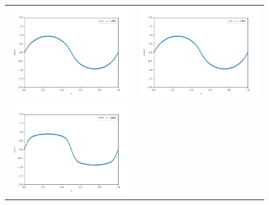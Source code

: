 \documentclass[12pt, reqno]{report}
\theoremstyle{definition}
\theoremstyle{remark}
\begin{document}
\begin{figure}[H]
\begin{tabular}{cc}
        \includegraphics[width = \acfdwidth]{media_paper/stable_CH_FD_1000} & 
        \includegraphics[width = \acfdwidth]{media_paper/unstable_CH_FD_1000} \\
        \includegraphics[width = \acfdwidth]{media_paper/stable_CH_FD_2600} & 

\end{tabular}
\end{figure}
\end{document}

